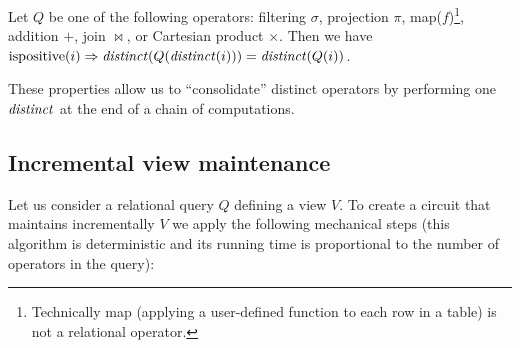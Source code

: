 \begin{proposition}\label{prop-distinct-once}
Let $Q$ be one of the following \zrs operators: filtering $\sigma$,
projection $\pi$, map($f$)\footnote{Technically map (applying a user-defined
function to each row in a table) is not a relational operator.},
addition $+$, join $\bowtie$, or
Cartesian product $\times$.
Then we have $\mbox{ispositive}(i) \Rightarrow \mathit{distinct}(Q(\mathit{distinct}(i))) = \mathit{distinct}(Q(i))$.
\end{proposition}

\begin{comment}
\noindent
\begin{tabular}{m{6.5cm}m{.5cm}}
\begin{tikzpicture}[auto,>=latex]
  \node[] (input) {$i$};
  \node[block, right of=input, node distance=1.5cm] (distinct) {$\distinct$};
  \node[block, right of=distinct, node distance=1.5cm] (q) {$Q$};
  \node[block, right of=q, node distance=1.5cm] (distinct1) {$\distinct$};
  \node[right of=distinct1, node distance=1.5cm] (output)  {$o$};
  \draw[->] (input) -- (distinct);
  \draw[->] (distinct) -- (q);
  \draw[->] (q) -- (distinct1);
  \draw[->] (distinct1) -- (output);
\end{tikzpicture}
&
$\cong$ \\
\begin{tikzpicture}[auto,>=latex]
  \node[] (input) {$i$};
  \node[block, right of=input] (q) {$Q$};
  \node[block, right of=q, node distance=1.5cm] (distinct1) {$\distinct$};
  \node[right of=distinct1, node distance=1.5cm] (output)  {$o$};
  \draw[->] (input) -- (q);
  \draw[->] (q) -- (distinct1);
  \draw[->] (distinct1) -- (output);
\end{tikzpicture}
\end{tabular}
\end{comment}

These properties allow us to ``consolidate'' distinct operators by performing
one $\mathit{distinct}$ at the end of a chain of computations.

\subsection{Incremental view maintenance}

Let us consider a relational query $Q$ 
defining a view $V$.  To create a circuit that maintains incrementally $V$
we apply the following mechanical steps (this algorithm is deterministic
and its running time is proportional to the number of operators in the query):


